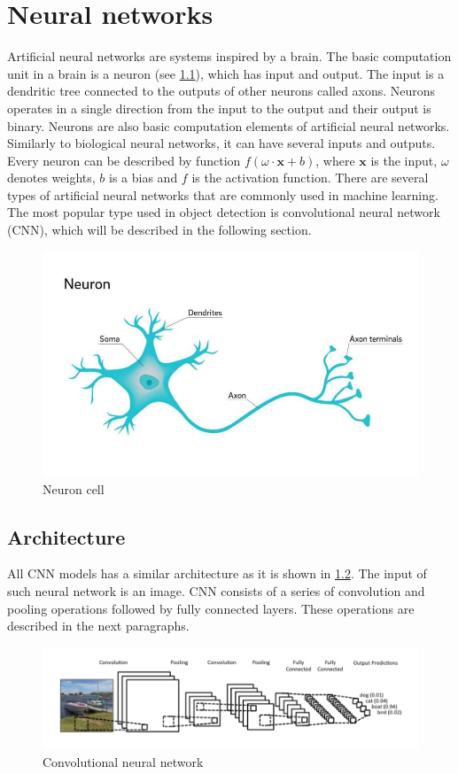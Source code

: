 \documentclass[twoside]{ctuthesis}
\theoremstyle{plain}
\theoremstyle{definition}
\theoremstyle{note}
\begin{document}
\chapter{Neural networks}
\label{chapter:neural_networks}
Artificial neural networks are systems inspired by a brain.     The basic computation unit in a brain is a neuron (see \ref{neuron}), which has input and output. The input is a dendritic tree connected to the outputs of other neurons called axons. Neurons operates in a single direction from the input to the output and their output is binary.  
Neurons are also basic computation elements of artificial neural networks. Similarly to biological neural networks, it can have several inputs and outputs. Every neuron can be described by function $f\left(\omega \cdot \textbf{x}  + b\right)$, where $\textbf{x}$ is the input, $\omega$ denotes weights, $b$ is a bias and $f$ is the activation function. 
There are several types of artificial neural networks that are commonly used in machine learning. The most popular type used in object detection is convolutional neural network (CNN), which will be described in the following section.
\begin{figure}[h]
\caption{Neuron cell\cite{staff_2018}}
\label{neuron}
\includegraphics[width=\textwidth]{images/neural_networks/2-whyareneuron.jpg}
\end{figure}
\section{Architecture}
All CNN models has a similar architecture as it is shown in \ref{conv_full}. The input of such neural network is an image. CNN consists of a series of convolution and pooling operations followed by fully connected layers. These operations are described in the next paragraphs. 
\begin{figure}[h]
\caption{Convolutional neural network\cite{britz_2016}}
\label{conv_full}
\includegraphics[width=\textwidth]{images/neural_networks/conv_full.png}
\end{figure}
\end{document}
